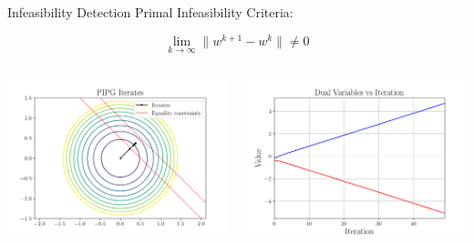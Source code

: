 \documentclass[aspectratio=169]{beamer}
\begin{document}
\begin{frame}{Infeasibility Detection}
    Primal Infeasibility Criteria: 
    
    \[\lim_{k\to\infty} \|w^{k+1}-w^k\| \neq 0\]
    \begin{columns}[T]
        \begin{column}{.5\textwidth}
            \includegraphics[width=7cm]{img/prim_infeas_pipg_iters.png}
        \end{column}
        \begin{column}{.5\textwidth}
            \includegraphics[width=7cm]{img/prim_infeas_dual_iters.png}
        \end{column}
    \end{columns}
\end{frame}
\end{document}
